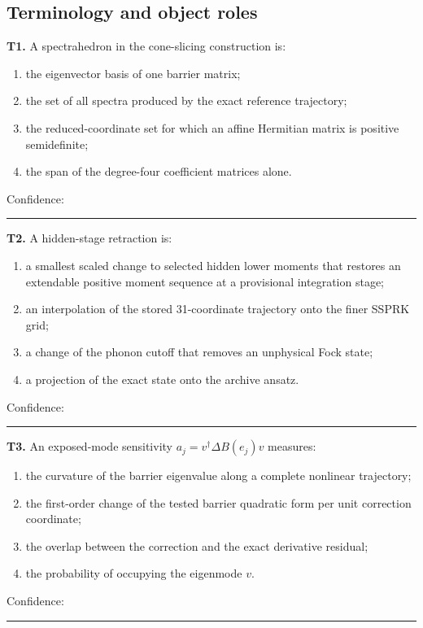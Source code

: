 \documentclass[11pt,letterpaper]{article}
\begin{document}
\subsection*{Terminology and object roles}

\textbf{T1.} A spectrahedron in the cone-slicing construction is:

\begin{enumerate}[label=\Alph*.]
\item the eigenvector basis of one barrier matrix;
\item the set of all spectra produced by the exact reference trajectory;
\item the reduced-coordinate set for which an affine Hermitian matrix is
positive semidefinite;
\item the span of the degree-four coefficient matrices alone.
\end{enumerate}
Confidence: \rule{0.12\textwidth}{0.4pt}

\textbf{T2.} A hidden-stage retraction is:

\begin{enumerate}[label=\Alph*.]
\item a smallest scaled change to selected hidden lower moments that restores
an extendable positive moment sequence at a provisional integration stage;
\item an interpolation of the stored 31-coordinate trajectory onto the finer
SSPRK grid;
\item a change of the phonon cutoff that removes an unphysical Fock state;
\item a projection of the exact state onto the archive ansatz.
\end{enumerate}
Confidence: \rule{0.12\textwidth}{0.4pt}

\textbf{T3.} An exposed-mode sensitivity \(a_j=v^\dagger\Delta B(e_j)v\)
measures:

\begin{enumerate}[label=\Alph*.]
\item the curvature of the barrier eigenvalue along a complete nonlinear
trajectory;
\item the first-order change of the tested barrier quadratic form per unit
correction coordinate;
\item the overlap between the correction and the exact derivative residual;
\item the probability of occupying the eigenmode \(v\).
\end{enumerate}
Confidence: \rule{0.12\textwidth}{0.4pt}
\end{document}
